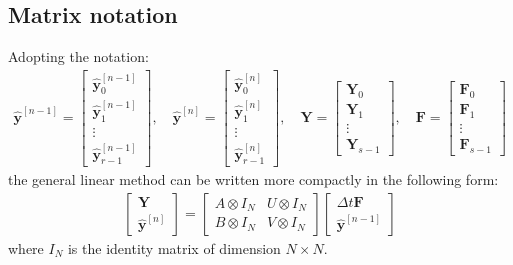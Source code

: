\subsection{Matrix notation}
Adopting the notation:
\begin{align*}
\boldsymbol{\hat{y}}^{[n-1]}= \left[\begin{array}{c}
\boldsymbol{\hat{y}}^{[n-1]}_0\\
\boldsymbol{\hat{y}}^{[n-1]}_1\\
\vdots\\
\boldsymbol{\hat{y}}^{[n-1]}_{r-1}
\end{array}\right],\quad \boldsymbol{\hat{y}}^{[n]}= \left[\begin{array}{c}
\boldsymbol{\hat{y}}^{[n]}_0\\
\boldsymbol{\hat{y}}^{[n]}_1\\
\vdots\\
\boldsymbol{\hat{y}}^{[n]}_{r-1}
\end{array}\right],\quad \boldsymbol{Y}= \left[\begin{array}{c}
\boldsymbol{Y}_0\\
\boldsymbol{Y}_1\\
\vdots\\
\boldsymbol{Y}_{s-1}
\end{array}\right],\quad \boldsymbol{F}= \left[\begin{array}{c}
\boldsymbol{F}_0\\
\boldsymbol{F}_1\\
\vdots\\
\boldsymbol{F}_{s-1}
\end{array}\right]\quad
\end{align*}
the general linear method can be written more compactly in the following form:
\begin{align*}
\left[ \begin{array}{c} \boldsymbol{Y}\\
\boldsymbol{\hat{y}}^{[n]}
\end{array}\right] = \left[ \begin{array}{cc} A\otimes I_N & U\otimes I_N \\
B\otimes I_N & V\otimes I_N \end{array}\right] \left[ \begin{array}{c} \Delta
t\boldsymbol{F}\\
\boldsymbol{\hat{y}}^{[n-1]}
\end{array}\right]
\end{align*}
where $I_N$ is the identity matrix of dimension $N\times N$.


